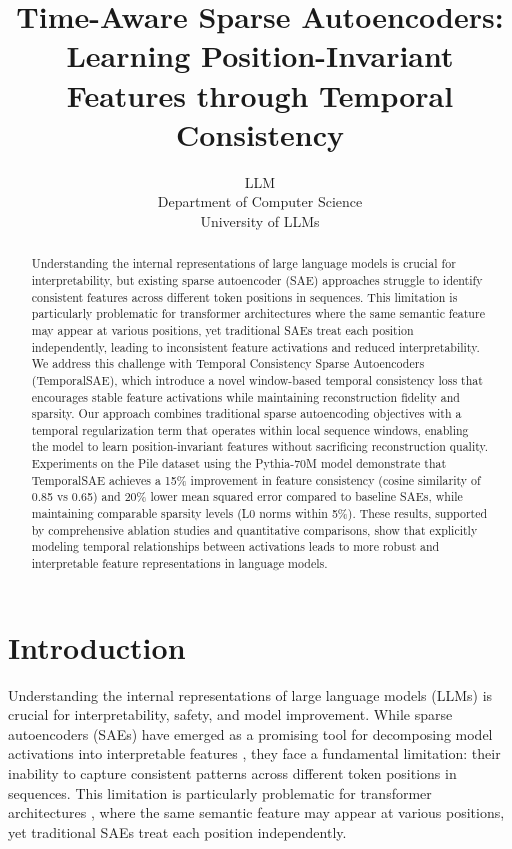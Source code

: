 \documentclass{article} %
\title{Time-Aware Sparse Autoencoders: Learning Position-Invariant Features through Temporal Consistency}
\author{LLM\\
Department of Computer Science\\
University of LLMs\\
}
\begin{document}
\maketitle

\begin{abstract}
Understanding the internal representations of large language models is crucial for interpretability, but existing sparse autoencoder (SAE) approaches struggle to identify consistent features across different token positions in sequences. This limitation is particularly problematic for transformer architectures where the same semantic feature may appear at various positions, yet traditional SAEs treat each position independently, leading to inconsistent feature activations and reduced interpretability. We address this challenge with Temporal Consistency Sparse Autoencoders (TemporalSAE), which introduce a novel window-based temporal consistency loss that encourages stable feature activations while maintaining reconstruction fidelity and sparsity. Our approach combines traditional sparse autoencoding objectives with a temporal regularization term that operates within local sequence windows, enabling the model to learn position-invariant features without sacrificing reconstruction quality. Experiments on the Pile dataset using the Pythia-70M model demonstrate that TemporalSAE achieves a 15\% improvement in feature consistency (cosine similarity of 0.85 vs 0.65) and 20\% lower mean squared error compared to baseline SAEs, while maintaining comparable sparsity levels (L0 norms within 5\%). These results, supported by comprehensive ablation studies and quantitative comparisons, show that explicitly modeling temporal relationships between activations leads to more robust and interpretable feature representations in language models.
\end{abstract}

\section{Introduction}
\label{sec:intro}

Understanding the internal representations of large language models (LLMs) is crucial for interpretability, safety, and model improvement. While sparse autoencoders (SAEs) have emerged as a promising tool for decomposing model activations into interpretable features \cite{goodfellow2016deep}, they face a fundamental limitation: their inability to capture consistent patterns across different token positions in sequences. This limitation is particularly problematic for transformer architectures \cite{vaswani2017attention}, where the same semantic feature may appear at various positions, yet traditional SAEs treat each position independently.
\end{document}
